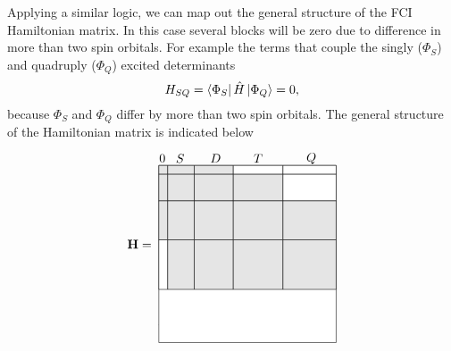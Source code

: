 \documentclass[../Main/chem532-notes.tex]{subfiles}
\begin{document}
Applying a similar logic, we can map out the general structure of the FCI Hamiltonian matrix. In this case several blocks will be zero due to difference in more than two spin orbitals. For example the terms that couple the singly ($\Phi_S$) and quadruply ($\Phi_Q$) excited determinants
\begin{equation}
H_{SQ} = \bra{\Phi_S}\hat{H}\ket{\Phi_Q} = 0,
\end{equation}
because $\Phi_S$ and $\Phi_Q$ differ by more than two spin orbitals.
The general structure of the Hamiltonian matrix is indicated below
\begin{equation}
\mathbf{H} =
 \begin{tikzpicture}[baseline={([yshift=-.5ex]current bounding box.center)},vertex/.style={anchor=base, minimum size=18pt, inner sep=2pt}]
 \draw (0,0.5) -- (0.5,0.5);
  \node[] at (0.1,5.2) {0};
  \node[] at (0.6,5.2) {$S$}; 
  \node[] at (1.6,5.2) {$D$};   
  \node[] at (2.8,5.2) {$T$}; 
  \node[] at (4.3,5.2) {$Q$};
  
  \filldraw[fill=white, draw=black] (0,0) rectangle (5,5);
  \filldraw[fill=black!10!white, draw=black] (0,5) rectangle (0.25,4.75);
  \filldraw[fill=black!10!white, draw=black] (0.25,5) rectangle (1.0,4.75);
    \filldraw[fill=black!10!white, draw=black] (1.0,5) rectangle (2.1,4.75);
	\filldraw[fill=white, draw=black] (2.1,5) rectangle (3.5,4.75);
	\filldraw[fill=white, draw=black] (3.5,5) rectangle (5,4.75);

  \filldraw[fill=black!10!white, draw=black] (0,4.75) rectangle (0.25,4.0);
  \filldraw[fill=black!10!white, draw=black] (0.25,4.75) rectangle (1.0,4.0);
    \filldraw[fill=black!10!white, draw=black] (1.0,4.75) rectangle (2.1,4.0);
	\filldraw[fill=black!10!white, draw=black] (2.1,4.75) rectangle (3.5,4.0);
	\filldraw[fill=white, draw=black] (3.5,4.75) rectangle (5,4.0);

  \filldraw[fill=black!10!white, draw=black] (0,4.0) rectangle (0.25,2.9);
  \filldraw[fill=black!10!white, draw=black] (0.25,4.0) rectangle (1.0,2.9);
    \filldraw[fill=black!10!white, draw=black] (1.0,4.0) rectangle (2.1,2.9);
	\filldraw[fill=black!10!white, draw=black] (2.1,4.0) rectangle (3.5,2.9);
	\filldraw[fill=black!10!white, draw=black] (3.5,4.0) rectangle (5,2.9);

  \filldraw[fill=white, draw=black] (0,2.9) rectangle (0.25,1.5);
  \filldraw[fill=black!10!white, draw=black] (0.25,2.9) rectangle (1.0,1.5);
    \filldraw[fill=black!10!white, draw=black] (1.0,2.9) rectangle (2.1,1.5);
	\filldraw[fill=black!10!white, draw=black] (2.1,2.9) rectangle (3.5,1.5);
	\filldraw[fill=black!10!white, draw=black] (3.5,2.9) rectangle (5,1.5);


\end{tikzpicture}
\end{equation}
\end{document}
